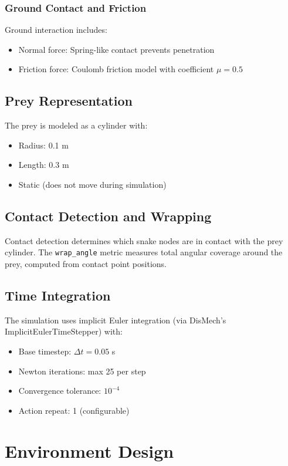 \documentclass[11pt]{article}
\begin{document}
\subsubsection{Ground Contact and Friction}

Ground interaction includes:
\begin{itemize}
    \item Normal force: Spring-like contact prevents penetration
    \item Friction force: Coulomb friction model with coefficient $\mu = 0.5$
\end{itemize}

\subsection{Prey Representation}

The prey is modeled as a cylinder with:
\begin{itemize}
    \item Radius: 0.1 m
    \item Length: 0.3 m
    \item Static (does not move during simulation)
\end{itemize}

\subsection{Contact Detection and Wrapping}

Contact detection determines which snake nodes are in contact with the prey cylinder. The \texttt{wrap\_angle} metric measures total angular coverage around the prey, computed from contact point positions.

\subsection{Time Integration}

The simulation uses implicit Euler integration (via DisMech's ImplicitEulerTimeStepper) with:
\begin{itemize}
    \item Base timestep: $\Delta t = 0.05$ s
    \item Newton iterations: max 25 per step
    \item Convergence tolerance: $10^{-4}$
    \item Action repeat: 1 (configurable)
\end{itemize}

\section{Environment Design}
\end{document}
